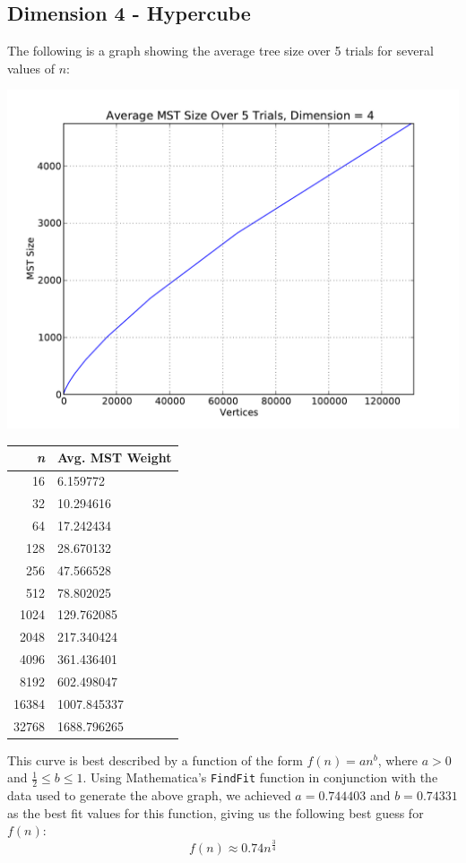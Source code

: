\documentclass[solution, letterpaper]{cs121}
\begin{document}
\subsection*{Dimension 4 - Hypercube}

The following is a graph showing the average tree size over 5 trials for several values of $n$:
\begin{center}
\includegraphics[scale=0.6]{graphs/kruskals-dimension-4.pdf}
\begin{tabular}{ | r | l |}
\hline
\bf{\itshape{n}} & \bf{Avg. MST Weight} \\
\hline
16 & 6.159772 \\
\hline
32 & 10.294616 \\
\hline
64 & 17.242434 \\
\hline
128 & 28.670132 \\
\hline
256 & 47.566528 \\
\hline
512 & 78.802025 \\
\hline
1024 & 129.762085 \\
\hline
2048 & 217.340424 \\
\hline
4096 & 361.436401 \\
\hline
8192 & 602.498047 \\
\hline
16384 & 1007.845337 \\
\hline
32768 & 1688.796265 \\
\hline
\end{tabular}
\end{center}

This curve is best described by a function of the form $f(n)=an^b$, where $a > 0$ and $\frac{1}{2} \leq b \leq 1$. Using Mathematica's {\tt FindFit} function in conjunction with the data used to generate the above graph, we achieved $a=0.744403$ and $b=0.74331$ as the best fit values for this function, giving us the following best guess for $f(n)$:
\[f(n) \approx 0.74n^{\frac{3}{4}}\]
\end{document}
